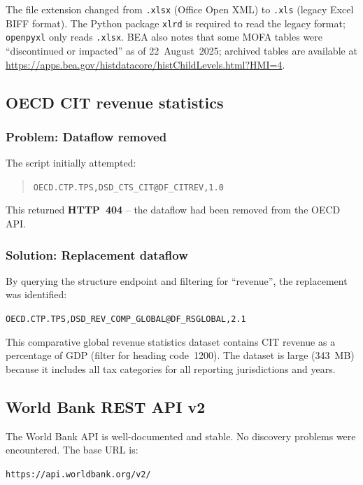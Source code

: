 \documentclass[12pt,a4paper]{article}
\begin{document}
\begin{notebox}
The file extension changed from \texttt{.xlsx} (Office Open XML) to \texttt{.xls} (legacy Excel BIFF format).
The Python package \texttt{xlrd} is required to read the legacy format; \texttt{openpyxl} only reads \texttt{.xlsx}.
BEA also notes that some MOFA tables were ``discontinued or impacted'' as of 22~August~2025; archived tables are available at \url{https://apps.bea.gov/histdatacore/histChildLevels.html?HMI=4}.
\end{notebox}


\subsection{OECD CIT revenue statistics}\label{sec:oecd_rev_discovery}

\subsubsection{Problem: Dataflow removed}

The script initially attempted:
\begin{quote}
\small\texttt{OECD.CTP.TPS,DSD\_CTS\_CIT@DF\_CITREV,1.0}
\end{quote}
This returned \textbf{HTTP~404} -- the dataflow had been removed from the OECD API.

\subsubsection{Solution: Replacement dataflow}

By querying the structure endpoint and filtering for ``revenue'', the replacement was identified:
\begin{center}
\texttt{OECD.CTP.TPS,DSD\_REV\_COMP\_GLOBAL@DF\_RSGLOBAL,2.1}
\end{center}
This comparative global revenue statistics dataset contains CIT revenue as a percentage of GDP (filter for heading code~1200).
The dataset is large (343~MB) because it includes all tax categories for all reporting jurisdictions and years.


\subsection{World Bank REST API v2}\label{sec:wb_api}

The World Bank API is well-documented and stable.
No discovery problems were encountered.
The base URL is:
\begin{apibox}
\texttt{https://api.worldbank.org/v2/}
\end{apibox}
\end{document}
